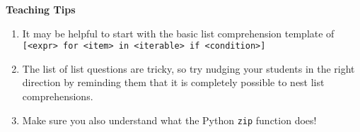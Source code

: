 \begin{questionmeta}
    \textbf{Teaching Tips}
    \begin{enumerate}
            \item It may be helpful to start with the basic list comprehension template of \texttt{[<expr> for <item> in <iterable> if <condition>]}
            \item The list of list questions are tricky, so try nudging your students in the right direction by reminding them that it is completely possible to nest list comprehensions.
            \item Make sure you also understand what the Python \texttt{zip} function does!
    \end{enumerate}
\end{questionmeta}

